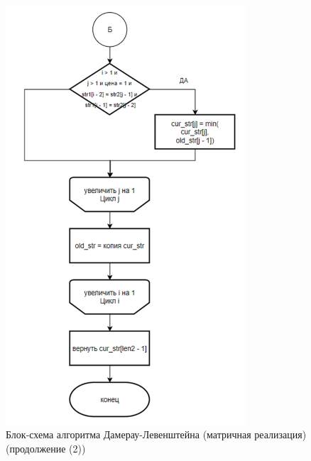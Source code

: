 \begin{figure}[H]
    \centering
    \includegraphics[width=0.8\textwidth]{img/block_2_1_3.png}
    \caption{Блок-схема алгоритма Дамерау-Левенштейна (матричная реализация)\\ (продолжение (2))}
\end{figure}

